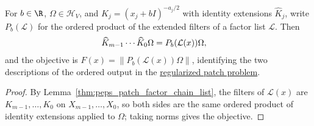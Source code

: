 \begin{lemma}
    \label{thm:peps_ordered_patch_output_coordinates}
    \leanok
    For $b\in\R$, $\Omega\in\mathcal H_V$, and $K_j=(x_j+bI)^{-a_j/2}$ with identity extensions $\widehat K_j$, write $P_b(\mathcal L)$ for the ordered product of the extended filters of a factor list $\mathcal L$. Then
    \begin{align}
        \widehat K_{m-1}\cdots\widehat K_0\Omega
         & =P_b(\mathcal L(x))\Omega,\notag
    \end{align}
    and the objective is $F(x)=\|P_b(\mathcal L(x))\Omega\|$, identifying the two descriptions of the ordered output in the
    \href{https://github.com/openai/math/blob/adc7f1241b42e322a6451854ab7e4b4c146bf78a/preprints/Polynomial-PEPS-approximation-of-gapped-square-grid-ground-states-September-24-2026/build/sections/03-patches.tex\#L68-L99}{regularized patch problem}.
\end{lemma}
\begin{proof}
    \leanok
    By Lemma~\ref{thm:peps_patch_factor_chain_list}, the filters of $\mathcal L(x)$ are $K_{m-1},\ldots,K_0$ on $X_{m-1},\ldots,X_0$, so both sides are the same ordered product of identity extensions applied to $\Omega$; taking norms gives the objective.
\end{proof}

